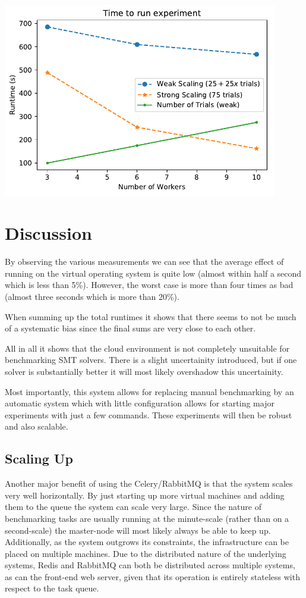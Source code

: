 \documentclass[a4paper]{IEEEtran}
\begin{document}
\begin{Figure}
  \centering \includegraphics[width=0.9\textwidth]{scaling_graph_large}
  \label{fig:scaling_large}
\end{Figure}

\section{Discussion}
By observing the various measurements we can see that the average
effect of running on the virtual operating system is quite low (almost
within half a second which is less than 5\%). However, the worst case
is more than four times as bad (almost three seconds which is more
than 20\%).

When summing up the total runtimes it shows that there seems to not be
much of a systematic bias since the final sums are very close to each
other.

All in all it shows that the cloud environment is not completely
unsuitable for benchmarking SMT solvers. There is a slight
uncertainity introduced, but if one solver is substantially better it
will most likely overshadow this uncertainity.

Most importantly, this system allows for replacing manual benchmarking
by an automatic system which with little configuration allows for
starting major experiments with just a few commands. These experiments
will then be robust and also scalable. 

\subsection{Scaling Up}
Another major benefit of using the Celery/RabbitMQ is that the system
scales very well horizontally. By just starting up more virtual
machines and adding them to the queue the system can scale very
large. Since the nature of benchmarking tasks are usually running at
the minute-scale (rather than on a second-scale) the master-node will
most likely always be able to keep up. Additionally, as the system outgrows its
constraints, the infrastructure can be placed on multiple machines. Due to the
distributed nature of the underlying systems, Redis and RabbitMQ can both be
distributed across multiple systems, as can the front-end web server, given that
its operation is entirely stateless with respect to the task queue.
\end{document}
